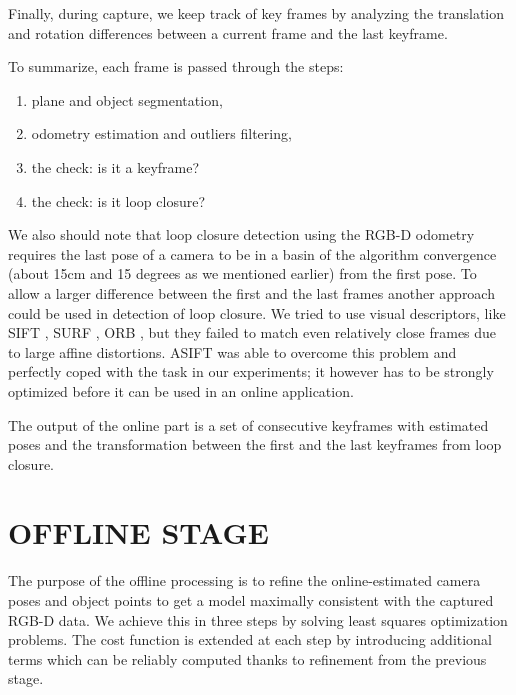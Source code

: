 \documentclass[letterpaper, 10 pt, conference]{ieeeconf}  %
\begin{document}
Finally, during capture, we keep track of key frames by analyzing the translation and rotation differences between a 
current frame and the last keyframe.

To summarize, each frame is passed through the steps:

\begin{enumerate}
 \item plane and object segmentation,
 \item odometry estimation and outliers filtering,
 \item the check: is it a keyframe?
 \item the check: is it loop closure?
\end{enumerate}

We also should note that loop closure detection using the RGB-D odometry requires
the last pose of a camera to be in a basin of
the algorithm convergence (about 15cm and 15 degrees as we mentioned earlier) from the first pose. 
To allow a larger difference between the first and the last frames
another approach could be used in detection of loop closure. We tried to use visual descriptors, like
SIFT \cite{lowe2004distinctive}, SURF \cite{bay2006surf}, ORB \cite{rublee2011orb}, but they failed to match even
relatively close frames due to large affine distortions.
ASIFT \cite{morel2009asift} was able to overcome this problem
and perfectly coped with the task in our experiments;
it however has to be strongly optimized before it can be used in an online application.

The output of the online part is a set of consecutive keyframes with 
estimated poses and the transformation between the first and the last 
keyframes from loop closure.


\section{OFFLINE STAGE}

\label{sec:offline}

The purpose of the offline processing is to refine the online-estimated 
camera poses and object points to get a model maximally 
consistent with the captured RGB-D data. We achieve this in three steps by 
solving least squares optimization problems. The cost function is extended at each step 
by introducing additional terms which can be reliably computed
thanks to refinement from the previous stage.

\end{document}
